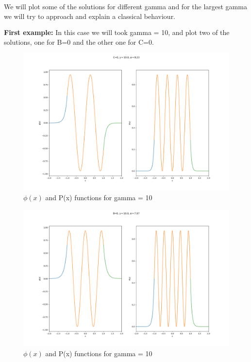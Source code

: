 We will plot some of the solutions for different gamma and for the largest gamma we will try to approach and explain a classical behaviour.

\textbf{First example: } In this case we will took gamma = 10, and plot two of the solutions, one for B=0 and the other one for C=0.

\begin{figure}[H]
    \centering
    \includegraphics{images3/phi_gamma=10.0_alpha=8.23.png}
    \caption{$\phi(x)$ and P(x) functions for gamma = 10}
    \label{gamma1=10}
\end{figure}

\begin{figure}[H]
    \centering
    \includegraphics{images3/phi_gamma=10.0_alpha=7.07.png}
    \caption{$\phi(x)$ and P(x) functions for gamma = 10}
    \label{gamma2=10}
\end{figure}


